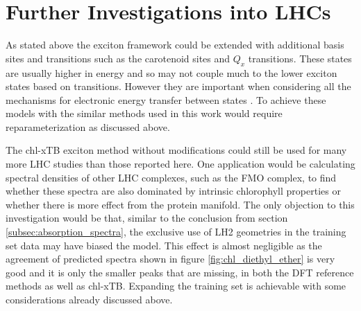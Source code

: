 \section{Further Investigations into LHCs}
\label{sec:lhc_investigations}

As stated above the exciton framework could be extended with additional basis sites
and transitions such as the carotenoid sites and $Q_x$ transitions. These states 
are usually higher in energy and so may not couple much to the lower exciton states
based on \Qy transitions. However they are important when considering all the mechanisms
for electronic energy transfer between states \cite{Polli2006}. To achieve these
models with the similar methods used in this work would require reparameterization 
as discussed above.

The chl-xTB exciton method without modifications could still be used for many more
LHC studies than those reported here. One application would be calculating spectral 
densities of other LHC complexes, such as the FMO complex, to find whether these 
spectra are also dominated by intrinsic chlorophyll properties or whether there 
is more effect from the protein manifold. The only objection to this investigation 
would be that, similar to the conclusion from section \ref{subsec:absorption_spectra}, 
the exclusive use of LH2 geometries in the training set data may have biased the 
model. This effect is almost negligible as the agreement of predicted spectra shown 
in figure \ref{fig:chl_diethyl_ether} is very good and it is only the smaller \Qy 
peaks that are missing, in both the DFT reference methods as well as chl-xTB. Expanding 
the training set is achievable with some considerations already discussed above.

